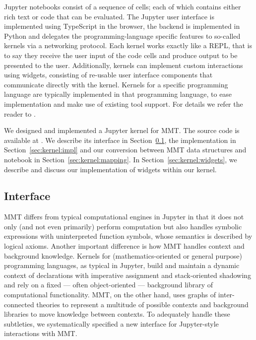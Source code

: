 Jupyter notebooks consist of a sequence of cells; each of which contains either rich text or code that can be evaluated. 
The Jupyter user interface is implemented using TypeScript in the browser, the backend is implemented in Python and delegates the programming-language specific features to so-called kernels via a networking protocol. 
Each kernel works exactly like a REPL, that is to say they receive the user input of the code cells and produce output to be presented to the user. 
Additionally, kernels can implement custom interactions using widgets, consisting of re-usable user interface components that communicate directly with the kernel.  
Kernels for a specific programming language are typically implemented in that programming language, to ease implementation and make use of existing tool support.
For details we refer the reader to \cite{jupyter-doc:on}. 

We designed and implemented a Jupyter kernel for MMT. 
The source code is available at \cite{mmt_jupyter:on}. 
We describe its interface in Section~\ref{sec:kernel:syntax}, the implementation in Section~\ref{sec:kernel:impl} and our conversion between MMT data structures and notebook in Section~\ref{sec:kernel:mapping}.
In Section~\ref{sec:kernel:widgets}, we describe and discuss our implementation of widgets within our kernel. 

\subsection{Interface}\label{sec:kernel:syntax}

MMT differs from typical computational engines in Jupyter in that it does not only (and not even primarily) perform computation but also handles symbolic expressions with uninterpreted function symbols, whose semantics is described by logical axioms.
Another important difference is how MMT handles context and background knowledge.
Kernels for (mathematics-oriented or general purpose) programming languages, as typical in Jupyter, build and maintain a dynamic context of declarations with imperative assignment and stack-oriented shadowing and rely on a fixed --- often object-oriented --- background library of computational functionality.
MMT, on the other hand, uses graphs of inter-connected theories to represent a multitude of possible contexts and background libraries to move knowledge between contexts.
To adequately handle these subtleties, we systematically specified a new interface for Jupyter-style interactions with MMT.

